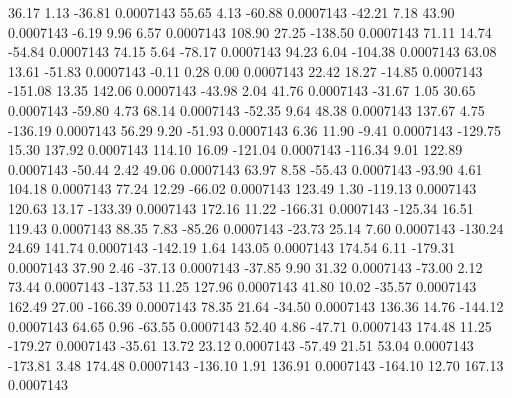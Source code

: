        36.17        1.13      -36.81     0.0007143
       55.65        4.13      -60.88     0.0007143
      -42.21        7.18       43.90     0.0007143
       -6.19        9.96        6.57     0.0007143
      108.90       27.25     -138.50     0.0007143
       71.11       14.74      -54.84     0.0007143
       74.15        5.64      -78.17     0.0007143
       94.23        6.04     -104.38     0.0007143
       63.08       13.61      -51.83     0.0007143
       -0.11        0.28        0.00     0.0007143
       22.42       18.27      -14.85     0.0007143
     -151.08       13.35      142.06     0.0007143
      -43.98        2.04       41.76     0.0007143
      -31.67        1.05       30.65     0.0007143
      -59.80        4.73       68.14     0.0007143
      -52.35        9.64       48.38     0.0007143
      137.67        4.75     -136.19     0.0007143
       56.29        9.20      -51.93     0.0007143
        6.36       11.90       -9.41     0.0007143
     -129.75       15.30      137.92     0.0007143
      114.10       16.09     -121.04     0.0007143
     -116.34        9.01      122.89     0.0007143
      -50.44        2.42       49.06     0.0007143
       63.97        8.58      -55.43     0.0007143
      -93.90        4.61      104.18     0.0007143
       77.24       12.29      -66.02     0.0007143
      123.49        1.30     -119.13     0.0007143
      120.63       13.17     -133.39     0.0007143
      172.16       11.22     -166.31     0.0007143
     -125.34       16.51      119.43     0.0007143
       88.35        7.83      -85.26     0.0007143
      -23.73       25.14        7.60     0.0007143
     -130.24       24.69      141.74     0.0007143
     -142.19        1.64      143.05     0.0007143
      174.54        6.11     -179.31     0.0007143
       37.90        2.46      -37.13     0.0007143
      -37.85        9.90       31.32     0.0007143
      -73.00        2.12       73.44     0.0007143
     -137.53       11.25      127.96     0.0007143
       41.80       10.02      -35.57     0.0007143
      162.49       27.00     -166.39     0.0007143
       78.35       21.64      -34.50     0.0007143
      136.36       14.76     -144.12     0.0007143
       64.65        0.96      -63.55     0.0007143
       52.40        4.86      -47.71     0.0007143
      174.48       11.25     -179.27     0.0007143
      -35.61       13.72       23.12     0.0007143
      -57.49       21.51       53.04     0.0007143
     -173.81        3.48      174.48     0.0007143
     -136.10        1.91      136.91     0.0007143
     -164.10       12.70      167.13     0.0007143
